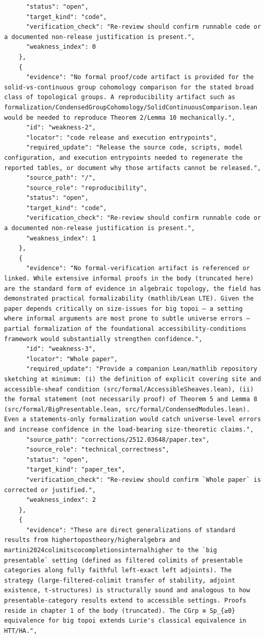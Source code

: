 \documentclass[11pt]{article}
\begin{document}
\begin{verbatim}
      "status": "open",
      "target_kind": "code",
      "verification_check": "Re-review should confirm runnable code or a documented non-release justification is present.",
      "weakness_index": 0
    },
    {
      "evidence": "No formal proof/code artifact is provided for the solid-vs-continuous group cohomology comparison for the stated broad class of topological groups. A reproducibility artifact such as formalization/CondensedGroupCohomology/SolidContinuousComparison.lean would be needed to reproduce Theorem 2/Lemma 10 mechanically.",
      "id": "weakness-2",
      "locator": "code release and execution entrypoints",
      "required_update": "Release the source code, scripts, model configuration, and execution entrypoints needed to regenerate the reported tables, or document why those artifacts cannot be released.",
      "source_path": "/",
      "source_role": "reproducibility",
      "status": "open",
      "target_kind": "code",
      "verification_check": "Re-review should confirm runnable code or a documented non-release justification is present.",
      "weakness_index": 1
    },
    {
      "evidence": "No formal-verification artifact is referenced or linked. While extensive informal proofs in the body (truncated here) are the standard form of evidence in algebraic topology, the field has demonstrated practical formalizability (mathlib/Lean LTE). Given the paper depends critically on size-issues for big topoi — a setting where informal arguments are most prone to subtle universe errors — partial formalization of the foundational accessibility-conditions framework would substantially strengthen confidence.",
      "id": "weakness-3",
      "locator": "Whole paper",
      "required_update": "Provide a companion Lean/mathlib repository sketching at minimum: (i) the definition of explicit covering site and accessible-sheaf condition (src/formal/AccessibleSheaves.lean), (ii) the formal statement (not necessarily proof) of Theorem 5 and Lemma 8 (src/formal/BigPresentable.lean, src/formal/CondensedModules.lean). Even a statements-only formalization would catch universe-level errors and increase confidence in the load-bearing size-theoretic claims.",
      "source_path": "corrections/2512.03648/paper.tex",
      "source_role": "technical_correctness",
      "status": "open",
      "target_kind": "paper_tex",
      "verification_check": "Re-review should confirm `Whole paper` is corrected or justified.",
      "weakness_index": 2
    },
    {
      "evidence": "These are direct generalizations of standard results from highertopostheory/higheralgebra and martini2024colimitscocompletionsinternalhigher to the `big presentable` setting (defined as filtered colimits of presentable categories along fully faithful left-exact left adjoints). The strategy (large-filtered-colimit transfer of stability, adjoint existence, t-structures) is structurally sound and analogous to how presentable-category results extend to accessible settings. Proofs reside in chapter 1 of the body (truncated). The CGrp ≅ Sp_{≥0} equivalence for big topoi extends Lurie's classical equivalence in HTT/HA.",

\end{verbatim}
\end{document}
